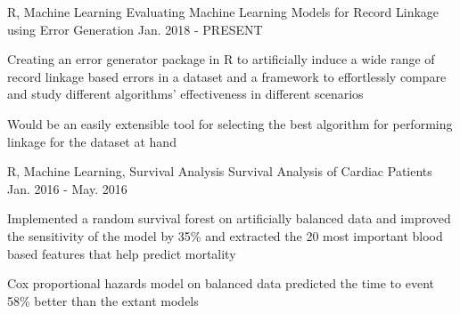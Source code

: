 \begin{cventries}
 \cventry
    {R, Machine Learning} %
    {Evaluating Machine Learning Models for Record Linkage using Error Generation} %
    {Jan. 2018 - PRESENT} %
    {} %
    {
      \begin{cvitems} %
        \item {Creating an error generator package in R to artificially induce a wide range of record linkage based errors in a dataset and a framework to effortlessly compare and study different algorithms’ effectiveness in different scenarios}
        \item {Would be an easily extensible tool for selecting the best algorithm for performing linkage for the dataset at hand}
      \end{cvitems}
    }

\cventry
    {R, Machine Learning, Survival Analysis} %
    {Survival Analysis of Cardiac Patients} %
    {Jan. 2016 - May. 2016} %
    {} %
    {
      \begin{cvitems} %
        \item {Implemented a random survival forest on artificially balanced data and improved the sensitivity of the model by 35\% and extracted the 20 most important blood based features that help predict mortality}
        \item {Cox proportional hazards model on balanced data predicted the time to event 58\% better than the extant models}
      \end{cvitems}
    }


\end{cventries}
